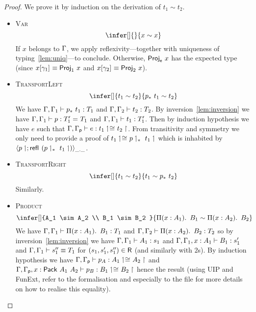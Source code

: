 \begin{proof}
  We prove it by induction on the derivation of $t_1 \sim t_2$.

  \begin{itemize}
    \item \textsc{Var}
    \[
      \infer[]
        { }
        {x \sim x}
    \]
    If $x$ belongs to $\Ga$, we apply reflexivity---together with uniqueness of
    typing~\eqref{lem:uniq}---to conclude.
    Otherwise, $\ProjE{x}$ has the expected type (since
    $\llift{\gamma}{}{x} \equiv \ProjO{x}$ and $\rlift{\gamma}{}{x} \equiv \ProjT{x}$).

    \item \textsc{TransportLeft}
    \[
      \infer[]
        {t_1 \sim t_2}
        {\translpo{p}\ t_1 \sim t_2}
    \]
    We have $\isterm{\Ga, \Ga_1}{\translpo{p}\ t_1}{T_1}$ and
    $\isterm{\Ga, \Ga_2}{t_2}{T_2}$.
    By inversion~\eqref{lem:inversion} we have
    $\isterm{\Ga, \Ga_1}{p}{\Eq{}{T_1'}{T_1}}$ and
    $\isterm{\Ga, \Ga_1}{t_1}{T_1'}$.
    Then by induction hypothesis we have $e$ such that
    $\isterm{\Ga, \Gp}{e}{\Heq{}{\lo{t_1}}{}{\ro{t_2}}}$.
    From transitivity and symmetry we only need to provide a proof of
    $\Heq{}{\lo{t_1}}{}{\translpo{\lo{p}}\ \lo{t_1}}$ which is inhabited by
    $\pair{\_}{\_}{\lo{p}}{\refl{} (\translpo{\lo{p}}\ \lo{t_1})}$.

    \item \textsc{TransportRight}
    \[
      \infer[]
        {t_1 \sim t_2}
        {t_1 \sim \translpo{p}\ t_2}
    \]
    Similarly.

    \item \textsc{Product}
    \[
      \infer[]
        {A_1 \sim A_2 \\
         B_1 \sim B_2
        }
        {\Prod{x:A_1} B_1 \sim \Prod{x:A_2} B_2}
    \]
    We have $\isterm{\Ga, \Ga_1}{\Prod{x:A_1} B_1}{T_1}$ and
    $\isterm{\Ga, \Ga_2}{\Prod{x:A_2} B_2}{T_2}$ so by
    inversion~\eqref{lem:inversion} we have $\isterm{\Ga, \Ga_1}{A_1}{s_1}$ and
    $\isterm{\Ga, \Ga_1, x:A_1}{B_1}{s'_1}$ and
    $\eqtype{\Ga, \Ga_1}{s''_1}{T_1}$ for $(s_1,s'_1,s''_1) \in \Rl$
    (and similarly with $2$s).
    By induction hypothesis we have
    $\isterm{\Ga, \Gp}{p_A}{\Heq{}{\lo{A_1}}{}{\ro{A_2}}}$ and
    $\isterm
      {\Ga, \Gp, x : \Pack{A_1}{A_2}}
      {p_B}
      {\Heq{}{\lo{B_1}}{}{\ro{B_2}}}
    $
    hence the result (using UIP and FunExt, refer to the
    formalisation and especially to the file  for more details
    on how to realise this equality).


\end{itemize}
\end{proof}
